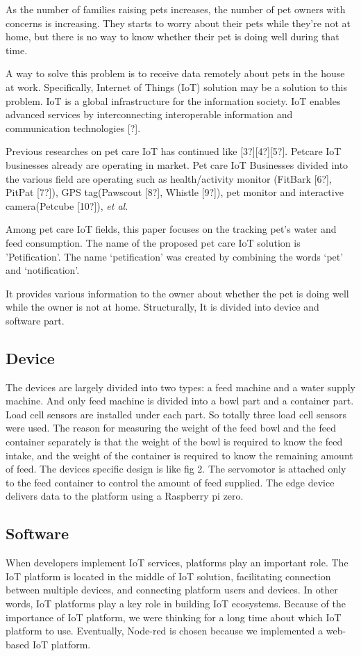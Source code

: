 \documentclass[conference]{IEEEtran}
\begin{document}
 As the number of families raising pets increases, the number of pet owners with concerns is increasing. They starts to worry about their pets while they’re not at home, but there is no way to know whether their pet is doing well during that time.

A way to solve this problem is to receive data remotely about pets in the house at work. Specifically, Internet of Things (IoT) solution may be a solution to this problem. IoT is a global infrastructure for the information society. IoT enables advanced services by interconnecting interoperable information and communication technologies [?].

Previous researches on pet care IoT has continued like [3?][4?][5?]. Petcare IoT businesses already are operating in market. Pet care IoT Businesses divided into the various field are operating such as health/activity monitor (FitBark [6?], PitPat [7?]), GPS tag(Pawscout [8?], Whistle [9?]),
pet monitor and interactive camera(Petcube [10?]), \textit{et al}.

 Among pet care IoT fields, this paper focuses on the tracking pet’s water and feed consumption. The name of the proposed pet care IoT solution is 'Petification'. The name ‘petification’ was created by combining the words ‘pet’ and ‘notification’.
 
It provides various information to the owner about whether the pet is doing well while the owner is not at home. Structurally, It is divided into device and software part.

\subsection{Device}
The devices are largely divided into two types: a feed machine and a water supply machine. And only feed machine is divided into a bowl part and a container part. Load cell sensors are installed under each part. So totally three load cell sensors were used. The reason for measuring the weight of the feed bowl and the feed container separately is that the weight of the bowl is required to know the feed intake, and the weight of the container is required to know the remaining amount of feed. The devices specific design is like fig 2. The servomotor is attached only to the feed container to control the amount of feed supplied. The edge device delivers data to the platform using a Raspberry pi zero.

\subsection{Software}
When developers implement IoT services, platforms play an important role. The IoT platform is located in the middle of IoT solution, facilitating connection between multiple devices, and connecting platform users and devices. In other words, IoT platforms play a key role in building IoT ecosystems. Because of the importance of IoT platform, we were thinking for a long time about which IoT platform to use. Eventually, Node-red is chosen because we implemented a web-based IoT platform. 
\end{document}
